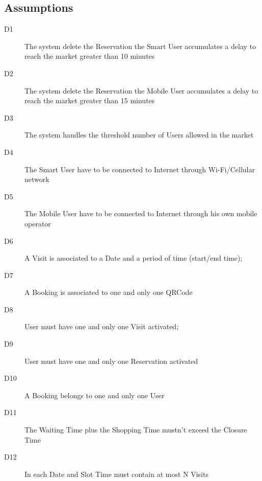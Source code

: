 \subsection{Assumptions}
\begin{description}
    \item[D1] The system delete the Reservation the Smart User accumulates a delay to reach the market greater than 10 minutes
    \item[D2] The system delete the Reservation the Mobile User accumulates a delay to reach the market greater than 15 minutes
    \item[D3] The system handles the threshold number of Users allowed in the market
    \item[D4] The Smart User have to be connected to Internet through Wi-Fi/Cellular network
    \item[D5] The Mobile User have to be connected to Internet through his own mobile operator
    \item[D6] A Visit is associated to a Date and a period of time (start/end time);
    \item[D7] A Booking is associated to one and only one QRCode
    \item[D8] User must have one and only one Visit activated;
    \item[D9] User must have one and only one Reservation activated
    \item[D10] A Booking belongs to one and only one User
    \item[D11] The Waiting Time plus the Shopping Time mustn’t exceed the Closure Time
    \item[D12] In each Date and Slot Time must contain at most N Visits
\end{description}